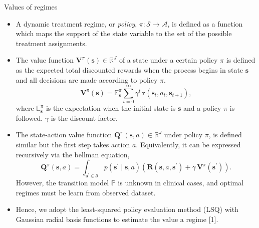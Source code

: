 \documentclass[final,hyperref={pdfpagelabels=false}]{beamer}
\newcommand{\bs}{ \boldsymbol}
\newcommand{\mb}{\mathbb}
\newcommand{\ml}{\mathcal}
\newcommand{\lt}{\left}
\newcommand{\rt}{\right}
\begin{document}
\begin{frame}[t]
\begin{columns}[t]
\begin{column}{.465\textwidth}
\begin{block}{Values of regimes}
	\begin{itemize}
\item  A dynamic treatment regime, or \textit{policy}, $\pi : \bs{\ml{S}} \to \mathcal{A}$, is defined as a function which maps the support of the state variable to the set of the possible treatment assignments.
 \item The value function $\bs{V}^{\pi}(\bs{s}) \in \mb{R}^J$ of a state under a certain policy $\pi$ is defined as the expected total discounted rewards when the process begins in state $\bs{s}$ and all decisions are made according to policy $\pi$.  $$\bs{V}^{\pi}\lt(\bs{s}\rt) = \mb{E}_{\bs{s}}^{\pi} \sum_{t=0}^{\infty} \gamma^{t} \, \bs{r}(\bs{s}_t, a_t, \bs{s}_{t+1}),$$ where $\mb{E}_{\bs{s}}^{\pi}$ is the expectation when the initial state is $\bs{s}$ and a policy $\pi$ is followed. $\gamma$ is the discount factor.
 \item  The state-action value function $\bs{Q}^{\pi}(\bs{s}, a) \in \mb{R}^J$ under policy $\pi$, is defined similar but the first step takes action $a$. Equivalently, it can be expressed recursively via the bellman equation, $$\bs{Q}^{\pi}(\bs{s}, a) = \int_{\bs{s}^{\prime}\in\bs{\ml{S}}} p\lt(\bs{s}^{\prime} \mid \bs{s}, a\rt) \lt( \bs{R}\lt(\bs{s}, a, \bs{s}^{\prime}\rt) + \gamma \, \bs{V}^{\pi}(\bs{s}^{\prime}) \rt).$$ 
However, the transition model $\mb{P}$ is unknown in clinical cases, and optimal regimes must be learn from observed dataset.  
\item Hence, we adopt the least-squared policy evaluation method (LSQ)  with Gaussian radial basis functions to estimate the value a regime [1].
\end{itemize}
\end{block}



\end{column}
\end{columns}
\end{frame}
\end{document}
